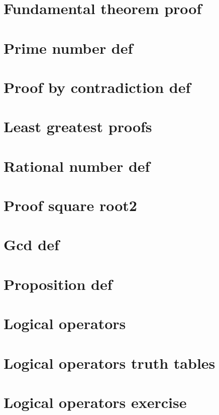 \section*{Fundamental theorem proof}

\vfill
\section*{Prime number def}

\vfill
\section*{Proof by contradiction def}

\vfill
\section*{Least greatest proofs}

\vfill
\section*{Rational number def}

\vfill
\section*{Proof square root2}

\vfill
\section*{Gcd def}

\vfill
\section*{Proposition def}

\vfill
\section*{Logical operators}

\vfill
\section*{Logical operators truth tables}

\vfill
\section*{Logical operators exercise}

\vfill
